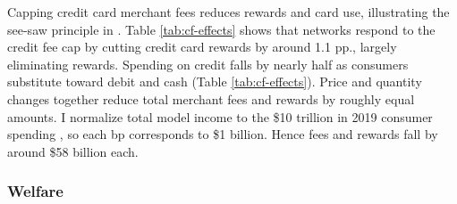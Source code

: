 \documentclass[main.tex]{subfiles}
\begin{document}
Capping credit card merchant fees reduces rewards and card use, illustrating the see-saw principle in \textcite{Rochet.Tirole2003}.
Table \ref{tab:cf-effects} shows that networks respond to the credit fee cap by cutting credit card rewards by around 1.1 pp., largely eliminating rewards.
Spending on credit falls by nearly half as consumers substitute toward debit and cash (Table \ref{tab:cf-effects}).
Price and quantity changes together reduce total merchant fees and rewards by roughly equal amounts.
I normalize total model income to the \$10 trillion in 2019 consumer spending \parencite{Nilson2020a}, so each bp corresponds to \$1 billion.
Hence fees and rewards fall by around \$58 billion each.

\begin{table}
    \caption{Counterfactual Effects on Prices and Shares}
    \label{tab:cf-effects}
    \begin{center}
        \small{
        
        }
    \end{center}
\end{table}

\subsubsection{Welfare}
\label{subsubsec:counterfactual-welfare}
\end{document}

